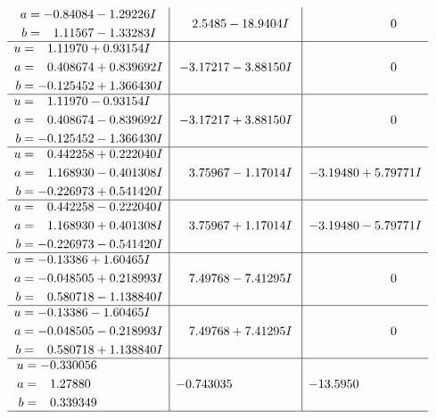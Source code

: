 \documentclass[1p]{elsarticle_modified}
\theoremstyle{definition}
\begin{document}
$$\begin{array}{c|c|c}
\begin{aligned}
a &= -0.84084 - 1.29226 I \\
b &= \phantom{-}1.11567 - 1.33283 I\end{aligned}
 & \phantom{-}2.5485 - 18.9404 I & \phantom{-0.000000 } 0 \\ \hline\begin{aligned}
u &= \phantom{-}1.11970 + 0.93154 I \\
a &= \phantom{-}0.408674 + 0.839692 I \\
b &= -0.125452 + 1.366430 I\end{aligned}
 & -3.17217 - 3.88150 I & \phantom{-0.000000 } 0 \\ \hline\begin{aligned}
u &= \phantom{-}1.11970 - 0.93154 I \\
a &= \phantom{-}0.408674 - 0.839692 I \\
b &= -0.125452 - 1.366430 I\end{aligned}
 & -3.17217 + 3.88150 I & \phantom{-0.000000 } 0 \\ \hline\begin{aligned}
u &= \phantom{-}0.442258 + 0.222040 I \\
a &= \phantom{-}1.168930 - 0.401308 I \\
b &= -0.226973 + 0.541420 I\end{aligned}
 & \phantom{-}3.75967 - 1.17014 I & -3.19480 + 5.79771 I \\ \hline\begin{aligned}
u &= \phantom{-}0.442258 - 0.222040 I \\
a &= \phantom{-}1.168930 + 0.401308 I \\
b &= -0.226973 - 0.541420 I\end{aligned}
 & \phantom{-}3.75967 + 1.17014 I & -3.19480 - 5.79771 I \\ \hline\begin{aligned}
u &= -0.13386 + 1.60465 I \\
a &= -0.048505 + 0.218993 I \\
b &= \phantom{-}0.580718 - 1.138840 I\end{aligned}
 & \phantom{-}7.49768 - 7.41295 I & \phantom{-0.000000 } 0 \\ \hline\begin{aligned}
u &= -0.13386 - 1.60465 I \\
a &= -0.048505 - 0.218993 I \\
b &= \phantom{-}0.580718 + 1.138840 I\end{aligned}
 & \phantom{-}7.49768 + 7.41295 I & \phantom{-0.000000 } 0 \\ \hline\begin{aligned}
u &= -0.330056\phantom{ +0.000000I} \\
a &= \phantom{-}1.27880\phantom{ +0.000000I} \\
b &= \phantom{-}0.339349\phantom{ +0.000000I}\end{aligned}
 & -0.743035\phantom{ +0.000000I} & -13.5950\phantom{ +0.000000I}\\
 \hline 
 \end{array}$$\newpage\newpage\renewcommand{\arraystretch}{1}
\end{document}
